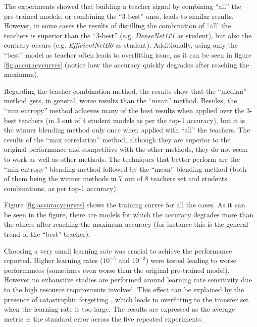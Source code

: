 The experiments showed that building a teacher signal by combining ``all'' the pre-trained models, or combining the ``3-best'' ones, leads to similar results. However, in some cases the results of distilling the combination of ``all' the teachers is superior than the ``3-best'' (e.g. \textit{DenseNet121} as student), but also the contrary occurs (e.g. \textit{EfficientNetB0} as student). Additionally, using only the ``best'' model as teacher often leads to overfitting issue, as it can be seen in figure \ref{fig:accuracycurves} (notice how the accuracy quickly degrades after reaching the maximum).

 Regarding the teacher combination method, the results show that the ``median'' method gets, in general, worse results than the ``mean'' method. Besides, the ``min entropy'' method achieves many of the best results when applied over the 3-best teachers (in 3 out of 4 student models as per the top-1 accuracy), but it is the winner blending method only once when applied with ``all'' the teachers. The results of the ``max correlation'' method, although they are superior to the original performance and competitive with the other methods, they do not seem to work as well as other methods. The techniques that better perform are the ``min entropy'' blending method followed by the ``mean'' blending method (both of them being the winner methods in 7 out of 8 teachers set and students combinations, as per top-1 accuracy).


Figure \ref{fig:accuracycurves}  shows the training curves for all the cases. As it can be seen in the figure, there are models for which the accuracy degrades more than the others after reaching the maximum accuracy (for instance this is the general trend of the ``best'' teacher). 

Choosing a very small learning rate was crucial to achieve the performance reported. Higher learning rates ($10^{-5}$ and  $10^{-3}$) were tested leading to worse performances (sometimes even worse than the original pre-trained model). However no exhaustive studies are performed around learning rate sensitivity due to the high resource requirements involved. This effect can be explained by the presence of catastrophic forgetting \autocite{French99}, which leads to overfitting to the transfer set when the learning rate is too large. The results are expressed as the average metric $\pm$ the standard error across the five repeated experiments.

